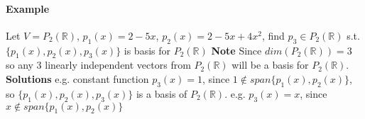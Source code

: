 \documentclass[11pt]{article}
\begin{document}
	\paragraph{Example} Let $V = P_2(\mathbb{R})$, $p_1(x) = 2-5x$, $p_2(x) = 2 - 5x + 4x^2$, find $p_3 \in P_2(\mathbb{R})$ s.t. $\{p_1(x), p_2(x), p_3(x)\}$ is basis for $P_2(\mathbb{R})$
	\newline \quad
	\newline
	\textbf{Note} Since $dim(P_2(\mathbb{R})) = 3$ so any 3 linearly independent vectors from $P_2(\mathbb{R})$ will be a basis for $P_2(\mathbb{R})$.
	\newline \quad
	\newline
	\textbf{Solutions} e.g. constant function $p_3(x) = 1$, since $1 \notin span\{p_1(x), p_2(x)\}$, so $\{p_1(x), p_2(x), p_3(x)\}$ is a basis of $P_2(\mathbb{R})$. e.g. $p_3(x) = x$, since $x \notin span\{p_1(x), p_2(x)\}$
	
\end{document}
